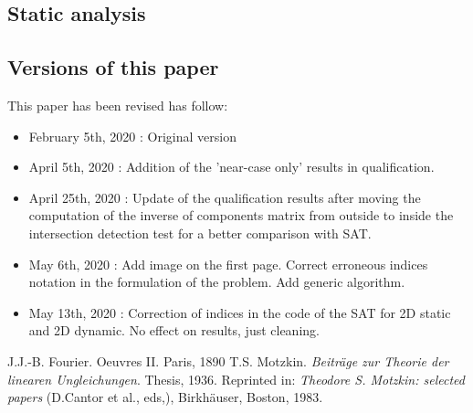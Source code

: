 \documentclass[12pt, a4paper]{article}
\begin{document}
\begin{scriptsize}
\begin{ttfamily}

\end{ttfamily}
\end{scriptsize}

\subsection{Static analysis}

\begin{scriptsize}
\begin{ttfamily}

\end{ttfamily}
\end{scriptsize}

\subsection{Versions of this paper}

This paper has been revised has follow:

\begin{itemize}
\item February 5th, 2020 : Original version
\item April 5th, 2020 : Addition of the 'near-case only' results in qualification.
\item April 25th, 2020 : Update of the qualification results after moving the computation of the inverse of components matrix from outside to inside the intersection detection test for a better comparison with SAT.
\item May 6th, 2020 : Add image on the first page. Correct erroneous indices notation in the formulation of the problem. Add generic algorithm.
\item May 13th, 2020 : Correction of indices in the code of the SAT for 2D static and 2D dynamic. No effect on results, just cleaning.
\end{itemize}

\begin{thebibliography}{9}
 J.J.-B. Fourier. Oeuvres II. Paris, 1890
 T.S. Motzkin. {\em Beitr\"{a}ge zur Theorie der linearen Ungleichungen}. Thesis, 1936. Reprinted in: {\em Theodore S. Motzkin: selected papers} (D.Cantor et al., eds,), Birkh\"{a}user, Boston, 1983.
\end{thebibliography}
\end{document}

